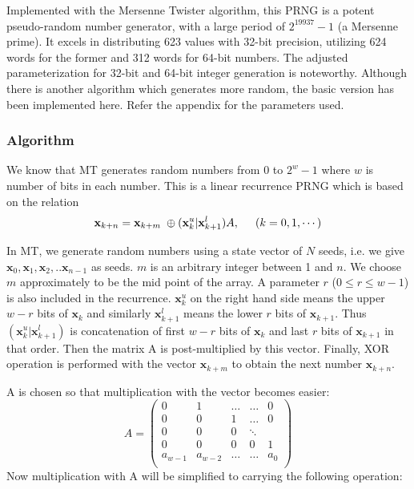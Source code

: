 \documentclass[titlepage, 11pt]{article}
\begin{document}
Implemented with the Mersenne Twister algorithm, this PRNG is a potent pseudo-random number generator, with a large period of $2^{19937}-1$ (a Mersenne prime). It excels in distributing 623 values with 32-bit precision, utilizing 624 words for the former and 312 words for 64-bit numbers. The adjusted parameterization for 32-bit and 64-bit integer generation is noteworthy. Although there is another algorithm which generates more random, the basic version has been implemented here. Refer the appendix for the parameters used.
\subsubsection{Algorithm}
We know that MT generates random numbers from 0 to $2^{w}-1$ where $w$ is number of bits in each number. This is a linear recurrence PRNG which is based on the relation 
$${\textbf{x}}_{k+n}={\textbf{x}}_{k+m}\hspace{0.1cm}\oplus(\textbf{x}_{k}^{u}\vert\textbf{x}_{k+1}^{l})A,\hspace{0.5cm}(k=0,1,\cdots)$$

In MT, we generate random numbers using a state vector of $N$ seeds, i.e. we give 
$\textbf{x}_0,\textbf{x}_1,\textbf{x}_2,..\textbf{x}_{n-1}$ as seeds. $m$ is an arbitrary integer between 1 and $n$. We choose $m$ approximately to be the mid point of the array. A parameter $r$ ($0\leq r \leq w-1$) is also included in the recurrence. $\textbf{x}_k^u$ on the right hand side means the upper $w-r$ bits of 
$\textbf{x}_{k}$ and similarly $\textbf{x}_{k+1}^l$ means the lower $r$ bits of $\textbf{x}_{k+1}$. Thus $(\textbf{x}_{k}^{u}\vert\textbf{x}_{k+1}^{l})$ is concatenation of first $w-r$ bits of $\textbf{x}_{k}$ and last $r$ bits of 
$\textbf{x}_{k+1}$ in that order. Then the matrix A is post-multiplied by this vector. Finally, XOR operation is performed with the vector  ${\textbf{x}}_{k+m}$ to obtain the next number ${\textbf{x}}_{k+n}$.

A is chosen so that multiplication with the vector becomes easier:
$$ A=\begin{pmatrix}
 0 & 1 & \dots & \dots & 0\\
 0 & 0 & 1 &\dots & 0\\
 0 & 0 & 0 & \ddots\\
 0 & 0 & 0  & 0 & 1\\
 a_{w-1} & a_{w-2} & \dots & \dots & a_0\\
 
\end{pmatrix}$$
Now multiplication with A will be simplified to carrying the following operation:\\
\end{document}
